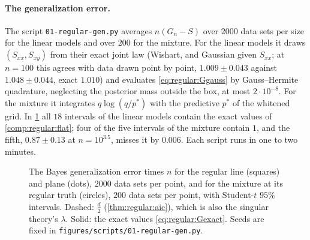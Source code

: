 \begin{refsection}
\paragraph{The generalization error.} The script \texttt{01-regular-gen.py} averages $n(G_n-S)$ over $2000$ data sets per size for the linear models and over $200$ for the mixture. For the linear models it draws $(S_{xx},S_{xy})$ from their exact joint law (Wishart, and Gaussian given $S_{xx}$; at $n=100$ this agrees with data drawn point by point, $1.009\pm0.043$ against $1.048\pm0.044$, exact $1.010$) and evaluates \eqref{eq:regular:Ggauss} by Gauss--Hermite quadrature, neglecting the posterior mass outside the box, at most $2\cdot10^{-8}$. For the mixture it integrates $q\log(q/p^*)$ with the predictive $p^*$ of the whitened grid. In \cref{fig:regular:gen} all $18$ intervals of the linear models contain the exact values of \cref{comp:regular:flat}; four of the five intervals of the mixture contain $1$, and the fifth, $0.87\pm0.13$ at $n=10^{3.5}$, misses it by $0.006$. Each script runs in one to two minutes.

\begin{figure}[t]
\centering
{}
\caption{The Bayes generalization error times $n$ for the regular line (squares) and plane (dots), $2000$ data sets per point, and for the mixture at its regular truth (circles), $200$ data sets per point, with Student-$t$ $95\%$ intervals. Dashed: $\frac d2$ (\cref{thm:regular:aic}), which is also the singular theory's $\lambda$. Solid: the exact values \eqref{eq:regular:Gexact}. Seeds are fixed in \texttt{figures/scripts/01-regular-gen.py}.}\label{fig:regular:gen}
\end{figure}


\end{refsection}
